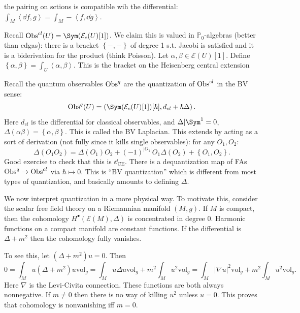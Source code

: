 
the pairing on sctions is compatible wih the differential: $\int_{M} \left\langle \dd f,g \right\rangle =\int_{M} -\left\langle f,\dd g \right\rangle $.

Recall $\Obs^{cl} (U)= \Sym (\mathcal{E} _c(U)[1])$. We claim this is valued in $\mathbb{P} _0$-algebras (better than cdgas): there is a bracket $\left\{ -,- \right\} $ of degree 1 s.t. Jacobi is satisfied and it is a biderivation for the product (think Poisson). Let $\alpha ,\beta \in \mathcal{E} (U)[1]$. Define $\left\{ \alpha ,\beta  \right\} =\int_{U} \left\langle \alpha ,\beta  \right\rangle $. This is the bracket on the Heisenberg central extension

Recall the quantum observables $\operatorname{Obs}^q$ are the quantization of $\operatorname{Obs}^{cl} $ in the BV sense:
\[
	\Obs^q(U) = \left( \Sym (\mathcal{E} _c(U)[1]) [\hbar ],d_{cl} + \hbar \Delta \right)
.\]
Here $d_{cl} $ is the differential for classical observables, and $\Delta |\Sym ^1=0$, $\Delta (\alpha \beta )=\left\{ \alpha ,\beta  \right\} $. This is called the BV Laplacian. This extends by acting as a sort of derivation (not fully since it kills single observables): for any $O_1,O_2$:
\[
	\Delta \left( O_1O_2 \right) =\Delta (O_1)O_2 + (-1)^{\left| O_1 \right| } O_1\Delta (O_2) + \left\{ O_1,O_2 \right\} 
.\]
Good exercise to check that this is $\dd _{\mathrm{CE} } $. There is a dequantization map of FAs $\operatorname{Obs}^{q} \to \operatorname{Obs}^{cl} $ via $\hbar \mapsto 0$. This is ``BV quantization'' which is different from most types of quantization, and basically amounts to defining $\Delta $.


We now interpret quantization in a more physical way. To motivate this, consider the scalar free field theory on a Riemannian manifold $(M,g)$. If $M$ is compact, then the cohomology $H^{\bullet} (\mathcal{E} (M),\Delta )$ is concentrated in degree 0. Harmonic functions on a compact manifold are constant functions. If the differential is $\Delta +m^2$ then the cohomology fully vanishes.

To see this, let $(\Delta +m^2)u=0$. Then
\[
	0=\int_{M} u(\Delta +m^2)u\mathrm{vol} _g = \int_{M} u\Delta u\mathrm{vol} _g + m^2 \int_{M} u^2 \mathrm{vol} _g = \int_{M} \left| \nabla u \right| ^2 \mathrm{vol} _g + m^2\int_{M} u^2 \mathrm{vol} _g
.\]
Here $\nabla $ is the Levi-Civita connection. These functions are both always nonnegative. If $m\neq 0$ then there is no way of killing $u^2$ unless $u=0$. This proves that cohomology is nonvanishing iff $m=0$.

